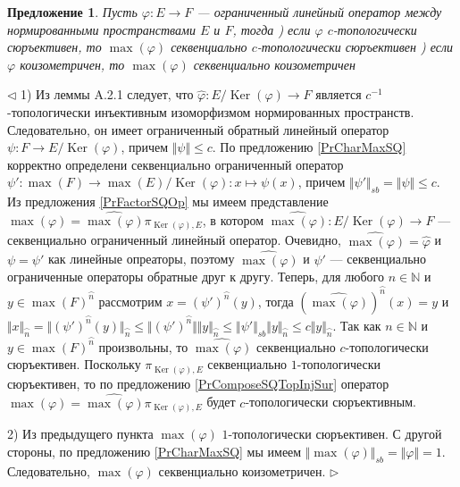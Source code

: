 \documentclass[12pt]{article}
\newtheorem{proposition}[theorem]{Предложение}
\newenvironment{proof}{\par $\triangleleft$}{$\triangleright$}
\begin{document}
\begin{proposition}\label{PrMaxPreserveQuotients} Пусть $\varphi:E\to F$ --- ограниченный линейный оператор между нормированными пространствами $E$ и $F$, тогда
) если $\varphi$ $c$-топологически сюръективен, то $\max(\varphi)$ секвенциально $c$-топологически сюръективен
) если $\varphi$ коизометричен, то $\max(\varphi)$ секвенциально коизометричен
\end{proposition}
\begin{proof} 1) Из леммы A.2.1 \cite{EROpSp} следует, что $\widehat{\varphi}:E/\operatorname{Ker}(\varphi)\to F$ является $c^{-1}$-топологически инъективным изоморфизмом нормированных пространств. Следовательно, он имеет ограниченный обратный линейный оператор $\psi:F\to E/\operatorname{Ker}(\varphi)$, причем $\Vert\psi\Vert\leq c$. По предложению \ref{PrCharMaxSQ} корректно определени секвенциально ограниченный оператор $\psi':\max(F)\to\max(E)/\operatorname{Ker}(\varphi):x\mapsto \psi(x)$, причем $\Vert\psi'\Vert_{sb}=\Vert\psi\Vert\leq c$. Из предложения \ref{PrFactorSQOp} мы имеем представление  $\max(\varphi)=\widehat{\max(\varphi)}\pi_{\operatorname{Ker}(\varphi),E}$, в котором $\widehat{\max(\varphi)}:E/\operatorname{Ker}(\varphi)\to F$ --- секвенциально ограниченный линейный оператор. Очевидно, $\widehat{\max(\varphi)}=\widehat{\varphi}$ и $\psi=\psi'$ как линейные опреаторы, поэтому $\widehat{\max(\varphi)}$ и $\psi'$ --- секвенциально ограниченные операторы обратные друг к другу. Теперь, для любого $n\in\mathbb{N}$ и  $y\in\max(F)^{\wideparen{n}}$ рассмотрим $x=(\psi')^{\wideparen{n}}(y)$, тогда $(\widehat{\max(\varphi)})^{\wideparen{n}}(x)=y$ и $\Vert x\Vert_{\wideparen{n}}=\Vert(\psi')^{\wideparen{n}}(y)\Vert_{\wideparen{n}}\leq\Vert(\psi')^{\wideparen{n}}\Vert\Vert y\Vert_{\wideparen{n}}\leq\Vert \psi'\Vert_{sb}\Vert y\Vert_{\wideparen{n}}\leq c\Vert y\Vert_{\wideparen{n}}$. Так как $n\in\mathbb{N}$ и $y\in \max(F)^{\wideparen{n}}$  произвольны, то $\widehat{\max(\varphi)}$ секвенциально $c$-топологически сюръективен. Поскольку $\pi_{\operatorname{Ker}(\varphi),E}$ секвенциально $1$-топологически сюръективен, то по предложению \ref{PrComposeSQTopInjSur} оператор $\max(\varphi)=\widehat{\max(\varphi)}\pi_{\operatorname{Ker}(\varphi),E}$ будет $c$-топологически сюръективным.

2) Из предыдущего пункта $\max(\varphi)$ $1$-топологически сюръективен. С другой стороны, по предложению \ref{PrCharMaxSQ} мы имеем $\Vert\max(\varphi)\Vert_{sb}=\Vert\varphi\Vert=1$. Следовательно, $\max(\varphi)$ секвенциально коизометричен.
\end{proof}
\end{document}

